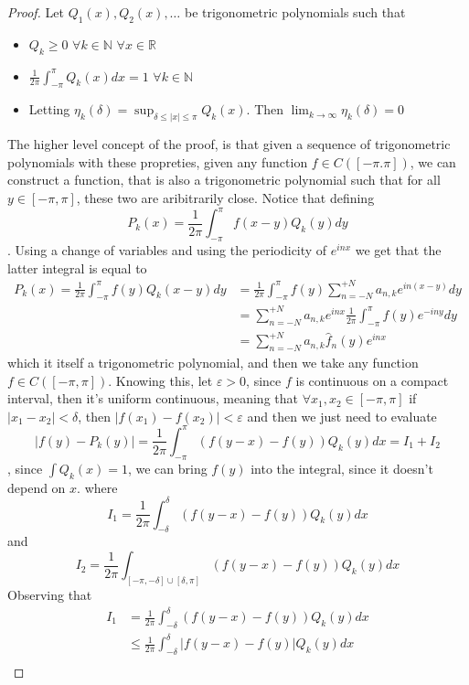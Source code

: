 \documentclass[13pt]{article}
\theoremstyle{definition} --- default
\theoremstyle{definition}
\theoremstyle{remark}
\begin{document}
\begin{proof}
    Let $Q_1(x), Q_2(x),\ldots$ be trigonometric polynomials such that 
    \begin{itemize}
        \item $Q_k \geq 0$ $\forall k \in \mathbb{N}$ $\forall x \in \mathbb{R}$
        \item $\frac{1}{2\pi} \int_{-\pi}^\pi Q_k(x) dx = 1$ $\forall k \in \mathbb{N}$
        \item Letting $\eta_k(\delta) = \sup_{\delta \leq |x| \leq \pi} Q_k(x)$. Then $\lim_{k \to \infty} \eta_k(\delta) = 0$
    \end{itemize}
    The higher level concept of the proof, is that given a sequence of trigonometric polynomials with these propreties, given any function $f \in C([-\pi.\pi])$, we can construct a function, that is also a trigonometric polynomial such that for all $y \in [-\pi,\pi]$, these two are aribitrarily close. 
    Notice that defining
    $$ P_k(x) = \frac{1}{2\pi} \int_{-\pi}^\pi f(x-y)Q_k(y) dy$$. Using a change of variables and using the periodicity of $e^{inx}$ we get that the latter integral is equal to  
    \begin{align*}
        P_k(x) = \frac{1}{2\pi} \int_{-\pi}^{ \pi} f(y) Q_k(x-y)dy &= \frac{1}{2\pi} \int_{-\pi}^\pi f(y) \sum_{n=-N}^{+N} a_{n,k} e^{in(x-y)}dy \\
        &= \sum_{n=-N}^{+N} a_{n,k} e^{inx} \frac{1}{2\pi} \int_{-\pi}^\pi f(y)e^{-iny}dy \\
        &= \sum_{n=-N}^{+N}a_{n,k} \hat{f}_n(y) e^{inx} 
    \end{align*}
    which it itself a trigonometric polynomial, and then we take any function $f \in C([-\pi,\pi])$. Knowing this, let $\varepsilon > 0$, since $f$ is continuous on a compact interval, then it's uniform continuous, meaning that $\forall x_1,x_2 \in [-\pi,\pi]$ if $|x_1-x_2| < \delta$, then $|f(x_1) - f(x_2)| < \varepsilon$  and then we just need to evaluate 
    $$|f(y) - P_k(y)| = \frac{1}{2\pi}\int_{-\pi}^\pi (f(y-x) - f(y))Q_k(y) dx = I_1 + I_2 $$, since $\int Q_k(x) = 1$, we can bring $f(y)$ into the integral, since it doesn't depend on $x$. 
    where 
    $$I_1 = \frac{1}{2\pi} \int_{-\delta}^\delta (f(y-x) - f(y))Q_k(y)dx$$
    and 
    $$I_2 = \frac{1}{2\pi} \int_{[-\pi,-\delta]\cup[\delta,\pi]} (f(y-x) - f(y))Q_k(y)dx$$
    Observing that 
    \begin{align*}
        I_1 &= \frac{1}{2\pi} \int_{-\delta}^\delta (f(y-x) - f(y))Q_k(y)dx \\
        &\leq \frac{1}{2\pi} \int_{-\delta}^\delta |f(y-x) - f(y)|Q_k(y)dx \\

\end{align*}
\end{proof}
\end{document}
